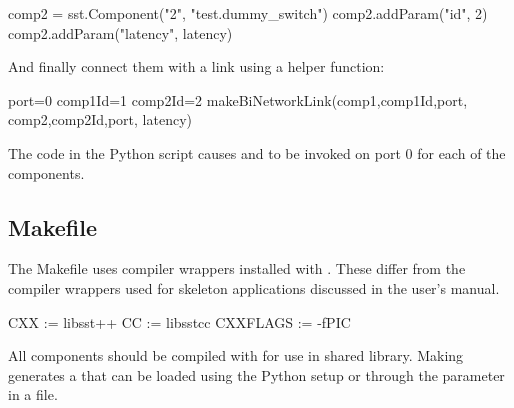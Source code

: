 \begin{CppCode}
comp2 = sst.Component("2", "test.dummy_switch")
comp2.addParam("id", 2)
comp2.addParam("latency", latency)
\end{CppCode}
And finally connect them with a link using a \sstmacro helper function:

\begin{CppCode}
port=0
comp1Id=1
comp2Id=2
makeBiNetworkLink(comp1,comp1Id,port,
                  comp2,comp2Id,port,
                  latency)
\end{CppCode}
The code in the Python script causes  and  to be invoked on port 0 for each of the components.

\subsection{Makefile}
The Makefile uses compiler wrappers installed with \sstmacro.
These differ from the compiler wrappers used for skeleton applications discussed in the user's manual.

\begin{ViFile}
CXX :=    libsst++
CC :=     libsstcc
CXXFLAGS := -fPIC
\end{ViFile}
All components should be compiled with  for use in shared library.
Making generates a  that can be loaded using the Python setup or through the  parameter in a  file.


